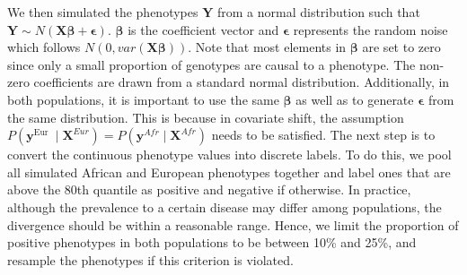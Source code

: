 \documentclass[a4paper,12pt]{article}
\begin{document}
We then simulated the phenotypes $\boldsymbol{Y}$ from a normal distribution such that $\boldsymbol{Y} \sim N(\boldsymbol{X \beta} + \boldsymbol{\epsilon})$. $\boldsymbol{\beta}$ is the coefficient vector and $\boldsymbol{\epsilon}$ represents the random noise which follows $N(0, var(\boldsymbol{X \beta}))$. Note that most elements in $\boldsymbol{\beta}$ are set to zero since only a small proportion of genotypes are causal to a phenotype. The non-zero coefficients are drawn from a standard normal distribution. Additionally, in both populations, it is important to use the same $\boldsymbol{\beta}$ as well as to generate $\boldsymbol{\epsilon}$ from the same distribution. This is because in covariate shift, the assumption $P\left(\mathbf{y}^{\text {Eur }} \mid \mathbf{X}^{E u r}\right)=P\left(\mathbf{y}^{A f r} \mid \mathbf{X}^{A f r}\right)$ needs to be satisfied. The next step is to convert the continuous phenotype values into discrete labels. To do this, we pool all simulated African and European phenotypes together and label ones that are above the $80$th quantile as positive and negative if otherwise. In practice, although the prevalence to a certain disease may differ among populations, the divergence should be within a reasonable range. Hence, we limit the proportion of positive phenotypes in both populations to be between 10\% and 25\%, and resample the phenotypes if this criterion is violated.
\end{document}
